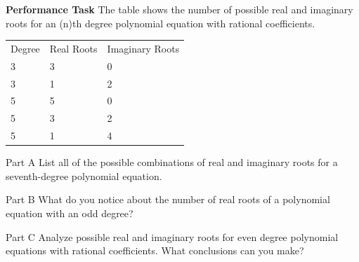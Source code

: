 \documentclass{article}
\newenvironment{practice}[2]{}{}        %
\newcommand{\answer}[1]{}               %
\newcommand{\te}[1]{}                   %
\begin{document}
\begin{practice}{38}{2}
\textbf{Performance Task} The table shows the number of possible real and imaginary roots for an (n)th degree polynomial equation with rational coefficients.
\begin{tabular}{lll}
Degree & Real Roots & Imaginary Roots \\
3 & 3 & 0 \\
3 & 1 & 2 \\
5 & 5 & 0 \\
5 & 3 & 2 \\
5 & 1 & 4 \\
\end{tabular}
Part A List all of the possible combinations of real and imaginary roots for a seventh-degree polynomial equation.
\answer{7 real and 0 complex, 5 real and 2 complex, 3 real and 4 complex, 1 real and 6 complex}
Part B What do you notice about the number of real roots of a polynomial equation with an odd degree?
\answer{A polynomial equation with an odd degree has an odd number of real roots.}
Part C Analyze possible real and imaginary roots for even degree polynomial equations with rational coefficients. What conclusions can you make?
\answer{All imaginary roots appear in even numbers because of conjugate pairs. Therefore, all the zeros may be imaginary, so there are even degree functions that do not cross the (x)-axis. If there are real roots, because of multiplicity, there may be any number of real roots such that (0\leq\text{number of real roots}\leq n), the degree.}
\te{The printed answer parts appear directly below answer 35 without a 38 label. Part C changes how multiplicities are counted.}
\end{practice}
\end{document}
